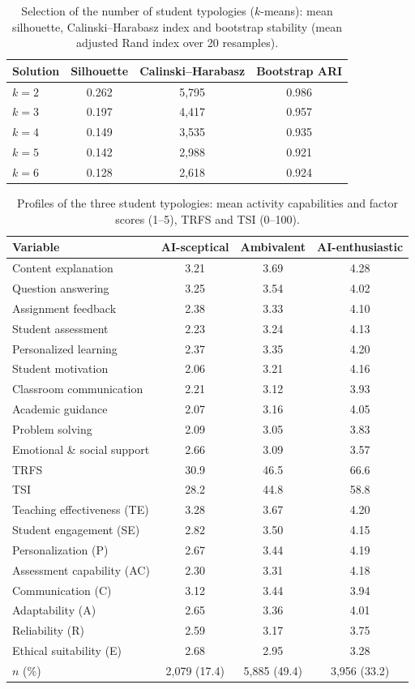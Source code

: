 \begin{table}[!htbp]
\centering
\caption{Selection of the number of student typologies ($k$-means): mean silhouette, Calinski--Harabasz index and bootstrap stability (mean adjusted Rand index over 20 resamples).}
\label{tab:A-kselect}
\footnotesize
\begin{tabular}{lccc}
\toprule
Solution & Silhouette & Calinski--Harabasz & Bootstrap ARI\\
\midrule
$k=2$ & 0.262 & 5,795 & 0.986\\
$k=3$ & 0.197 & 4,417 & 0.957\\
$k=4$ & 0.149 & 3,535 & 0.935\\
$k=5$ & 0.142 & 2,988 & 0.921\\
$k=6$ & 0.128 & 2,618 & 0.924\\
\bottomrule
\end{tabular}
\end{table}

\begin{table}[!htbp]
\centering
\caption{Profiles of the three student typologies: mean activity capabilities and factor scores (1--5), TRFS and TSI (0--100).}
\label{tab:A-typology}
\footnotesize
\begin{tabular}{lccc}
\toprule
Variable & AI-sceptical & Ambivalent & AI-enthusiastic\\
\midrule
Content explanation & 3.21 & 3.69 & 4.28\\
Question answering & 3.25 & 3.54 & 4.02\\
Assignment feedback & 2.38 & 3.33 & 4.10\\
Student assessment & 2.23 & 3.24 & 4.13\\
Personalized learning & 2.37 & 3.35 & 4.20\\
Student motivation & 2.06 & 3.21 & 4.16\\
Classroom communication & 2.21 & 3.12 & 3.93\\
Academic guidance & 2.07 & 3.16 & 4.05\\
Problem solving & 2.09 & 3.05 & 3.83\\
Emotional \& social support & 2.66 & 3.09 & 3.57\\
TRFS & 30.9 & 46.5 & 66.6\\
TSI & 28.2 & 44.8 & 58.8\\
Teaching effectiveness (TE) & 3.28 & 3.67 & 4.20\\
Student engagement (SE) & 2.82 & 3.50 & 4.15\\
Personalization (P) & 2.67 & 3.44 & 4.19\\
Assessment capability (AC) & 2.30 & 3.31 & 4.18\\
Communication (C) & 3.12 & 3.44 & 3.94\\
Adaptability (A) & 2.65 & 3.36 & 4.01\\
Reliability (R) & 2.59 & 3.17 & 3.75\\
Ethical suitability (E) & 2.68 & 2.95 & 3.28\\
$n$ (\%) & 2,079 (17.4) & 5,885 (49.4) & 3,956 (33.2)\\
\bottomrule
\end{tabular}
\end{table}

